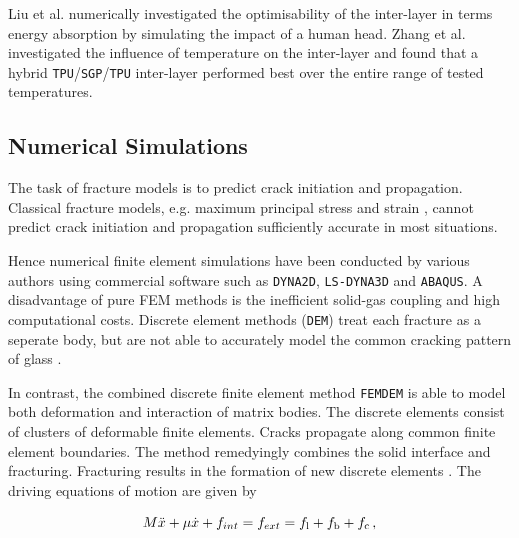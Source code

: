 \documentclass[format=acmtog, 12pt, screen=true, review=false]{acmart}
\begin{document}
\bigbreak
Liu et al. \cite{Liu16} numerically investigated the optimisability of the inter-layer in terms energy absorption by simulating the impact of a human head. Zhang et al. \cite{Zha19} investigated the influence of temperature on the inter-layer and found that a hybrid \texttt{TPU}/\texttt{SGP}/\texttt{TPU} inter-layer performed best over the entire range of tested temperatures.


\subsection{Numerical Simulations}

The task of fracture models is to predict crack initiation and propagation. Classical fracture models, e.g. maximum principal stress and strain \cite{Alt17}, cannot predict crack initiation and propagation sufficiently accurate in most situations. 

\bigbreak
Hence numerical finite element simulations have been conducted by various authors using commercial software such as \texttt{DYNA2D}, \texttt{LS-DYNA3D} and \texttt{ABAQUS}. A disadvantage of pure FEM methods is the inefficient solid-gas coupling and high computational costs. Discrete element methods (\texttt{DEM}) treat each fracture as a seperate body, but are not able to accurately model the common cracking pattern of glass \cite{Che17}.

\bigbreak
In contrast, the combined discrete finite element method \texttt{FEMDEM} \cite{Wan18, Mun95, Mun99, Mun04, Mun12, Mun13, Guo16, Gao14, Xu14, Che18} is able to model both deformation and interaction of matrix bodies. The discrete elements consist of clusters of deformable finite elements. Cracks propagate along common finite element boundaries. The method remedyingly combines the solid interface and fracturing. Fracturing results in the formation of new discrete elements \cite{Mun13}. The driving equations of motion are given by

\begin{equation}
    M\ddot{x}+\mu\dot{x}+f_{int}=f_{ext}=f_{\rm{l}}+f_{\rm{b}}+f_{\rm{c}}\,,
\end{equation}
\end{document}
